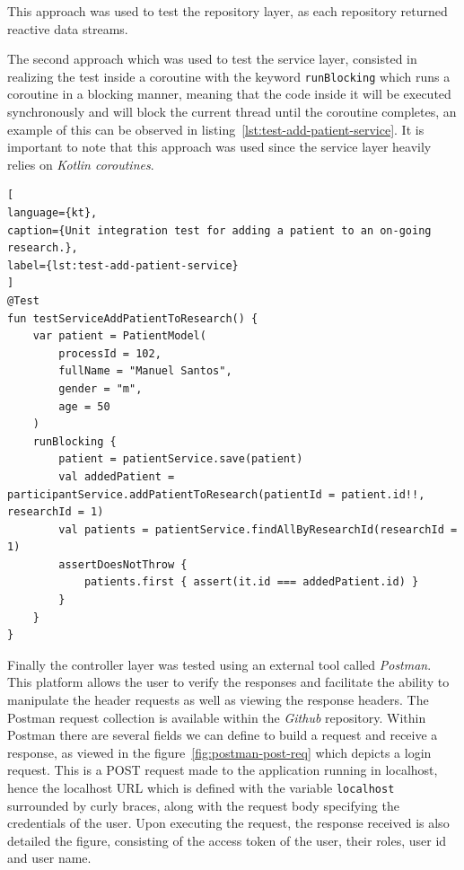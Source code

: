This approach was used to test the repository layer, as each repository returned reactive data streams.

The second approach which was used to test the service layer, consisted in realizing the test inside a coroutine with the keyword \lstinline{runBlocking} which runs a coroutine in a blocking manner, meaning that the code inside it will be executed synchronously and will block the current thread until the coroutine completes, an example of this can be observed in listing~\ref{lst:test-add-patient-service}. It is important to note that this approach was used since the service layer heavily relies on \textit{Kotlin coroutines}.

\begin{lstlisting}[
language={kt},
caption={Unit integration test for adding a patient to an on-going research.},
label={lst:test-add-patient-service}
]
@Test
fun testServiceAddPatientToResearch() {
    var patient = PatientModel(
        processId = 102,
        fullName = "Manuel Santos",
        gender = "m",
        age = 50
    )
    runBlocking {
        patient = patientService.save(patient)
        val addedPatient = participantService.addPatientToResearch(patientId = patient.id!!, researchId = 1)
        val patients = patientService.findAllByResearchId(researchId = 1)
        assertDoesNotThrow {
            patients.first { assert(it.id === addedPatient.id) }
        }
    }
}
\end{lstlisting}

Finally the controller layer was tested using an external tool called \textit{Postman}. This platform allows the user to verify the responses and facilitate the ability to manipulate the header requests as well as viewing the response headers. The Postman request collection is available within the \textit{Github} repository.
Within Postman there are several fields we can define to build a request and receive a response, as viewed in the figure~\ref{fig:postman-post-req} which depicts a login request. This is a POST request made to the application running in localhost, hence the localhost URL which is defined with the variable \lstinline{localhost} surrounded by curly braces, along with the request body specifying the credentials of the user. Upon executing the request, the response received is also detailed the figure, consisting of the access token of the user, their roles, user id and user name.

